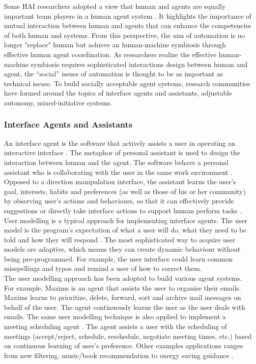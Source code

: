 Some HAI researchers adopted a view that human and agents are equally important team players in a human agent system \cite{Sukthankara}. It highlights the importance of mutual interaction between human and agents that can enhance the competencies of both human and systems. From this perspective, the aim of automation is no longer "replace" human but achieve an human-machine symbiosis through effective human agent coordination. As researchers realize the effective human-machine symbiosis requires sophisticated interactions design between human and agent, the ``social'' issues of automation is thought to be as important as technical issues\cite{Bradshaw2011}. To build socially acceptable agent systems, research communities have formed around the topics of interface agents and assistants, adjustable autonomy, mixed-initiative systems.

\subsubsection{Interface Agents and Assistants}
An interface agent is the software that actively assists a user in operating an interactive interface \cite{Lieberman2003}. The metaphor of personal assistant is used to design the interaction between human and the agent. The software behave a personal assistant who is collaborating with the user in the same work environment \cite{Lieberman1997}. Opposed to a direction manipulation interface, the assistant learns the user's goal, interests, habits and preferences (as well as those of his or her community) by observing user's actions and behaviours,  so that it can effectively provide suggestions or directly take interface actions to support human perform tasks \cite{Maes1994}.\\

User modelling is a typical approach for implementing interface agents. The user model is the program's expectation of what a user will do, what they need to be told and how they will respond \cite{Lieberman2003}.  The most sophisticated way to acquire user models are adaptive, which means they can create dynamic behaviour without being pre-programmed. For example, the user interface could learn common misspellings and typos and remind a user of how to correct them.\\

The user modelling approach has been adopted to build various agent systems. For example, Maxims \cite{Metral1998} is an agent that assists the user to organise their emails. Maxims learns to prioritize, delete, forward, sort and archive mail messages on behalf of the user. The agent continuously learns the user as the user deals with emails. The same user modelling technique is also applied to implement a meeting scheduling agent \cite{Kozierok1993}. The agent assists a user with the scheduling of meetings (accept/reject, schedule, reschedule, negotiate meeting times, etc.) based on continuous learning of user's preference. Other examples applications ranges from new filtering, music/book recommendation \cite{Lieberman2003} to energy saving guidance \cite{Costanza2014}.



